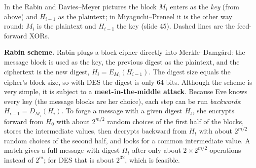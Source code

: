 \begin{center}
\end{center}
In the Rabin and Davies--Meyer pictures the block $M_i$ enters as the \emph{key} (from above) and $H_{i-1}$ as the plaintext; in Miyaguchi--Preneel it is the other way round: $M_i$ is the plaintext and $H_{i-1}$ the key (slide 45). Dashed lines are the feed-forward XORs.

\textbf{Rabin scheme.} Rabin plugs a block cipher directly into Merkle--Damg\aa rd: the message block is used as the key, the previous digest as the plaintext, and the ciphertext is the new digest, $H_i = E_{M_i}(H_{i-1})$. The digest size equals the cipher's block size, so with DES the digest is only 64 bits. Although the scheme is very simple, it is subject to a \textbf{meet-in-the-middle attack}. Because Eve knows every key (the message blocks are her choice), each step can be run \emph{backwards}: $H_{i-1} = D_{M_i}(H_i)$. To forge a message with a given digest $H_t$, she encrypts forward from $H_0$ with about $2^{m/2}$ random choices of the first half of the blocks, stores the intermediate values, then decrypts backward from $H_t$ with about $2^{m/2}$ random choices of the second half, and looks for a common intermediate value. A match gives a full message with digest $H_t$ after only about $2 \times 2^{m/2}$ operations instead of $2^m$; for DES that is about $2^{32}$, which is feasible.

